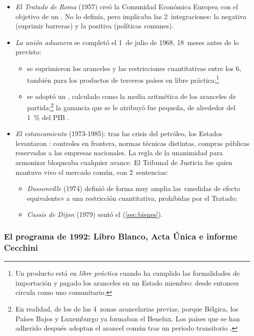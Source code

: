 \documentclass[11pt]{article}
\begin{document}
\begin{itemize}
\item \emph{El Tratado de Roma} (1957) creó la Comunidad Económica Europea con el objetivo de un . No lo definía, pero implicaba las 2~integraciones: la negativa (suprimir barreras) y la positiva (políticas comunes).
\item \emph{La unión aduanera} se completó el 1~de julio de 1968, 18~meses antes de lo previsto:
  \begin{itemize}
  \item se suprimieron los aranceles y las restricciones cuantitativas entre los 6, también para los productos de terceros países en libre práctica;\footnote{Un producto está en \emph{libre práctica} cuando ha cumplido las formalidades de importación y pagado los aranceles en un Estado miembro: desde entonces circula como uno comunitario.}
  \item se adoptó un , calculado como la media aritmética de los aranceles de partida;\footnote{En realidad, de los de las 4~zonas arancelarias previas, porque Bélgica, los Países Bajos y Luxemburgo ya formaban el Benelux. Los países que se han adherido después adoptan el arancel común tras un periodo transitorio .} la ganancia que se le atribuyó fue pequeña, de alrededor del 1~\% del PIB .
  \end{itemize}
\item \emph{El estancamiento} (1973-1985): tras las crisis del petróleo, los Estados levantaron : controles en frontera, normas técnicas distintas, compras públicas reservadas a las empresas nacionales. La regla de la unanimidad para armonizar bloqueaba cualquier avance. El Tribunal de Justicia fue quien mantuvo vivo el mercado común, con 2~sentencias:
  \begin{itemize}
  \item \emph{Dassonville} (1974) definió de forma muy amplia las «medidas de efecto equivalente» a una restricción cuantitativa, prohibidas por el Tratado;
  \item \emph{Cassis de Dijon} (1979) sentó el  (\ref{sec:bienes}).
  \end{itemize}
\end{itemize}

\subsubsection{El programa de 1992: Libro Blanco, Acta Única e informe Cecchini}\label{sec:programa-1992}
\end{document}

